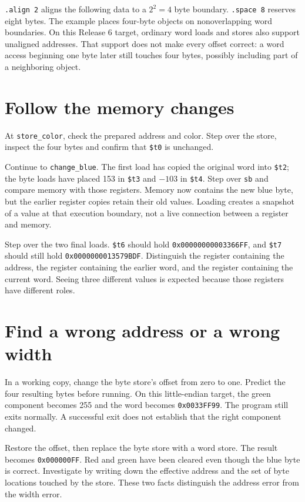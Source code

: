 \texttt{.align 2} aligns the following data to a $2^2=4$ byte boundary.
\texttt{.space 8} reserves eight bytes. The example places four-byte objects on
nonoverlapping word boundaries. On this Release 6 target, ordinary word loads
and stores also support unaligned addresses. That support does not make every
offset correct: a word access beginning one byte later still touches four bytes,
possibly including part of a neighboring object.

\section{Follow the memory changes}

At \texttt{store\_color}, check the prepared address and color. Step over the
store, inspect the four bytes and confirm that \texttt{\$t0} is unchanged.

Continue to \texttt{change\_blue}. The first load has copied the original word
into \texttt{\$t2}; the byte loads have placed 153 in \texttt{\$t3} and
$-103$ in \texttt{\$t4}. Step over \texttt{sb} and compare memory with those
registers. Memory now contains the new blue byte, but the earlier register copies
retain their old values. Loading creates a snapshot of a value at that execution
boundary, not a live connection between a register and memory.

Step over the two final loads. \texttt{\$t6} should hold
\texttt{0x00000000003366FF}, and \texttt{\$t7} should still hold
\texttt{0x0000000013579BDF}. Distinguish the register containing the address,
the register containing the earlier word, and the register containing the current
word. Seeing three different values is expected because those registers have
different roles.

\section{Find a wrong address or a wrong width}

In a working copy, change the byte store's offset from zero to one. Predict the
four resulting bytes before running. On this little-endian target, the green
component becomes 255 and the word becomes \texttt{0x0033FF99}. The program still
exits normally. A successful exit does not establish that the right component
changed.

Restore the offset, then replace the byte store with a word store. The result
becomes \texttt{0x000000FF}. Red and green have been cleared even though the
blue byte is correct. Investigate by writing down the effective address and the
set of byte locations touched by the store. These two facts distinguish the
address error from the width error.

